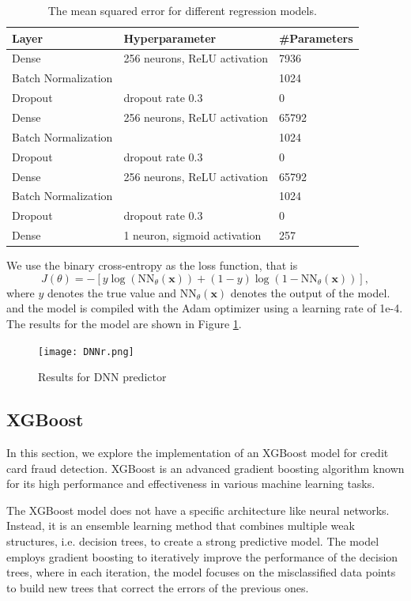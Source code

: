 \begin{table}[htbp]
    \centering
    \caption{The mean squared error for different regression models.}
    \begin{tabularx}{\textwidth}{ p{5cm} p{6cm} L }
\toprule
    Layer&Hyperparameter&\#Parameters\\
\midrule
    Dense&256 neurons, ReLU activation&7936\\
	Batch Normalization&&1024\\
	Dropout&dropout rate 0.3&0\\
	Dense&256 neurons, ReLU activation&65792\\
	Batch Normalization&&1024\\
	Dropout&dropout rate 0.3&0\\
	Dense&256 neurons, ReLU activation&65792\\
	Batch Normalization&&1024\\
	Dropout&dropout rate 0.3&0\\
	Dense&1 neuron, sigmoid activation&257\\
\bottomrule
    \end{tabularx}
    \label{tab:NN_str}
\end{table}

We use the binary cross-entropy as the loss function, that is 
\[J(\theta)=-[y\log(\mathrm{NN}_\theta(\mathbf{x}))+(1-y)\log(1-\mathrm{NN}_\theta(\mathbf{x}))],\]
where $y$ denotes the true value and $\mathrm{NN}_\theta(\mathbf{x})$ denotes the output of the model. and the model is compiled with the Adam optimizer using a learning rate of 1e-4.
The results for the model are shown in Figure \ref{fig:DNNr}.

\begin{figure}[h]
	\centering
	\texttt{[image: DNNr.png]}
	\caption{Results for DNN predictor}
	\label{fig:DNNr}
\end{figure}



\subsection{XGBoost}

In this section, we explore the implementation of an XGBoost model for credit card fraud detection. XGBoost is an advanced gradient boosting algorithm known for its high performance and effectiveness in various machine learning tasks.

The XGBoost model does not have a specific architecture like neural networks. Instead, it is an ensemble learning method that combines multiple weak structures, i.e. decision trees, to create a strong predictive model. The model employs gradient boosting to iteratively improve the performance of the decision trees, where in each iteration, the model focuses on the misclassified data points to build new trees that correct the errors of the previous ones.

